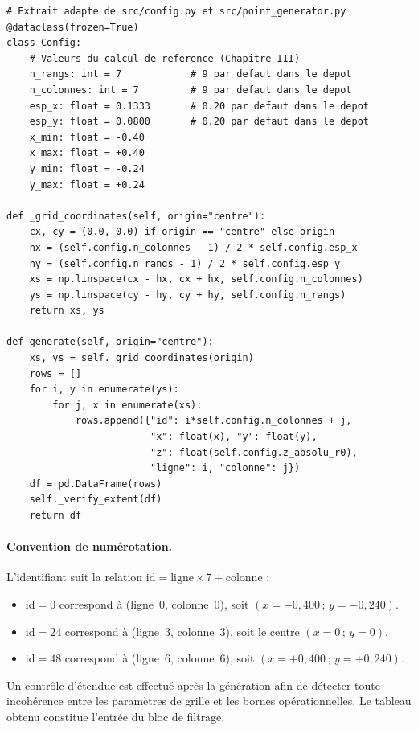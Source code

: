 \begin{lstlisting}[caption={Construction deterministe des coordonnees et des identifiants des points},label={lst:B1}]
# Extrait adapte de src/config.py et src/point_generator.py
@dataclass(frozen=True)
class Config:
    # Valeurs du calcul de reference (Chapitre III)
    n_rangs: int = 7            # 9 par defaut dans le depot
    n_colonnes: int = 7         # 9 par defaut dans le depot
    esp_x: float = 0.1333       # 0.20 par defaut dans le depot
    esp_y: float = 0.0800       # 0.20 par defaut dans le depot
    x_min: float = -0.40
    x_max: float = +0.40
    y_min: float = -0.24
    y_max: float = +0.24

def _grid_coordinates(self, origin="centre"):
    cx, cy = (0.0, 0.0) if origin == "centre" else origin
    hx = (self.config.n_colonnes - 1) / 2 * self.config.esp_x
    hy = (self.config.n_rangs - 1) / 2 * self.config.esp_y
    xs = np.linspace(cx - hx, cx + hx, self.config.n_colonnes)
    ys = np.linspace(cy - hy, cy + hy, self.config.n_rangs)
    return xs, ys

def generate(self, origin="centre"):
    xs, ys = self._grid_coordinates(origin)
    rows = []
    for i, y in enumerate(ys):
        for j, x in enumerate(xs):
            rows.append({"id": i*self.config.n_colonnes + j,
                         "x": float(x), "y": float(y),
                         "z": float(self.config.z_absolu_r0),
                         "ligne": i, "colonne": j})
    df = pd.DataFrame(rows)
    self._verify_extent(df)
    return df
\end{lstlisting}

\paragraph{Convention de numérotation.}
L'identifiant suit la relation $\mathrm{id} = \mathrm{ligne} \times 7 + \mathrm{colonne}$ :
\begin{itemize}[itemsep=1pt,topsep=2pt]
\item $\mathrm{id} = 0$ correspond à (ligne~$0$, colonne~$0$), soit $(x = -0{,}400\,;\, y = -0{,}240)$.
\item $\mathrm{id} = 24$ correspond à (ligne~$3$, colonne~$3$), soit le centre $(x = 0\,;\, y = 0)$.
\item $\mathrm{id} = 48$ correspond à (ligne~$6$, colonne~$6$), soit $(x = +0{,}400\,;\, y = +0{,}240)$.
\end{itemize}
Un contrôle d'étendue est effectué après la génération afin de détecter toute incohérence entre les paramètres de grille et les bornes opérationnelles. Le tableau obtenu constitue l'entrée du bloc de filtrage.

